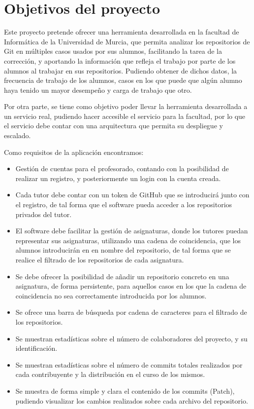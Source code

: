 \chapter{Objetivos del proyecto\label{03analisisObjetivos}}

Este proyecto pretende ofrecer una herramienta desarrollada en la facultad de Informática de la Universidad de Murcia, que permita analizar los repositorios de Git en múltiples casos usados por sus alumnos, facilitando la tarea de la corrección, y aportando la información que refleja el trabajo por parte de los alumnos al trabajar en sus repositorios. Pudiendo obtener de dichos datos, la frecuencia de trabajo de los alumnos, casos en los que puede que algún alumno haya tenido un mayor desempeño y carga de trabajo que otro.

Por otra parte, se tiene como objetivo poder llevar la herramienta desarrollada a un servicio real, pudiendo hacer accesible el servicio para la facultad, por lo que el servicio debe contar con una arquitectura que permita su despliegue y escalado.

Como requisitos de la aplicación encontramos:

\begin{itemize}
	\item Gestión de cuentas para el profesorado, contando con la posibilidad de realizar un registro, y posteriormente un login con la cuenta creada.
	
	\item Cada tutor debe contar con un token de GitHub que se introducirá junto con el registro, de tal forma que el software pueda acceder a los repositorios privados del tutor.
	\item El software debe facilitar la gestión de asignaturas, donde los tutores puedan representar sus asignaturas, utilizando una cadena de coincidencia, que los alumnos introducirán en en nombre del repositorio, de tal forma que se realice el filtrado de los repositorios de cada asignatura.
	\item Se debe ofrecer la posibilidad de añadir un repositorio concreto en una asignatura, de forma persistente, para aquellos casos en los que la cadena de coincidencia no sea correctamente introducida por los alumnos.
	\item Se ofrece una barra de búsqueda por cadena de caracteres para el filtrado de los repositorios.
	\item Se muestran estadísticas sobre el número de colaboradores del proyecto, y su identificación.
	\item Se muestran estadísticas sobre el número de commits totales realizados por cada contribuyente y la distribución en el curso de los mismos.
	\item Se muestra de forma simple y clara el contenido de los commits (Patch), pudiendo visualizar los cambios realizados sobre cada archivo del repositorio.
 
	
\end{itemize}

